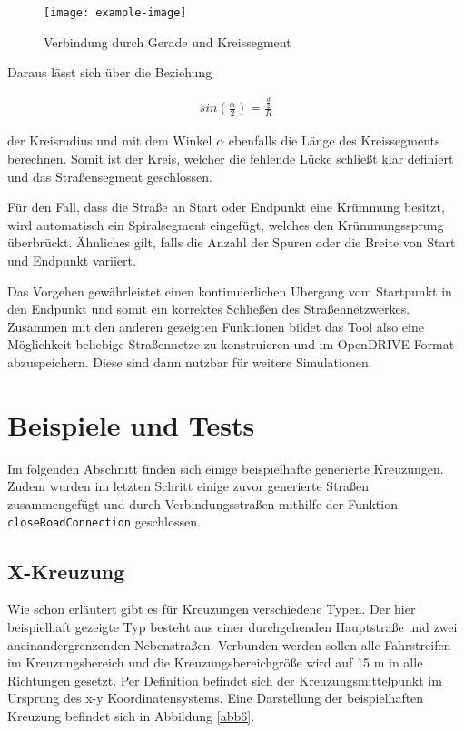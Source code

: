 \begin{figure}[H]
\flushleft
\texttt{[image: example-image]}
\caption{Verbindung durch Gerade und Kreissegment}
\label{abb5}
\end{figure}

Daraus lässt sich über die Beziehung

\begin{align}
sin(\frac{\alpha}{2}) = \frac{\frac{d}{2}}{R}
\end{align}

der Kreisradius und mit dem Winkel \(\alpha\) ebenfalls die Länge des Kreissegments berechnen. Somit ist der Kreis, welcher die fehlende Lücke schließt klar definiert und das Straßensegment geschlossen.

Für den Fall, dass die Straße an Start oder Endpunkt eine Krümmung besitzt, wird automatisch ein Spiralsegment eingefügt, welches den Krümmungssprung überbrückt. Ähnliches gilt, falls die Anzahl der Spuren oder die Breite von Start und Endpunkt variiert.

Das Vorgehen gewährleistet einen kontinuierlichen Übergang vom Startpunkt in den Endpunkt und somit ein korrektes Schließen des Straßennetzwerkes. Zusammen mit den anderen gezeigten Funktionen bildet das Tool also eine Möglichkeit beliebige Straßennetze zu konstruieren und im OpenDRIVE Format abzuspeichern. Diese sind dann nutzbar für weitere Simulationen.

\chapter{Beispiele und Tests}

Im folgenden Abschnitt finden sich einige beispielhafte generierte Kreuzungen. Zudem wurden im letzten Schritt einige zuvor generierte Straßen zusammengefügt und durch Verbindungsstraßen mithilfe der Funktion \texttt{closeRoadConnection} geschlossen.

\section{X-Kreuzung}
Wie schon erläutert gibt es für Kreuzungen verschiedene Typen. Der hier beispielhaft gezeigte Typ besteht aus einer durchgehenden Hauptstraße und zwei aneinandergrenzenden Nebenstraßen. Verbunden werden sollen alle Fahrstreifen im Kreuzungsbereich und die Kreuzungsbereichgröße wird auf 15 m in alle Richtungen gesetzt. Per Definition befindet sich der Kreuzungsmittelpunkt im Ursprung des x-y Koordinatensystems. Eine Darstellung der beispielhaften Kreuzung befindet sich in Abbildung \ref{abb6}.


